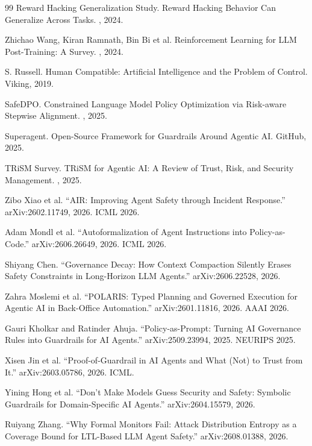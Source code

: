 \begin{thebibliography}{99}
Reward Hacking Generalization Study.
\newblock Reward Hacking Behavior Can Generalize Across Tasks.
, 2024.

Zhichao Wang, Kiran Ramnath, Bin Bi et al.
\newblock Reinforcement Learning for LLM Post-Training: A Survey.
, 2024.

S. Russell.
\newblock Human Compatible: Artificial Intelligence and the Problem of Control.
\newblock Viking, 2019.

SafeDPO.
\newblock Constrained Language Model Policy Optimization via Risk-aware Stepwise Alignment.
, 2025.

Superagent.
\newblock Open-Source Framework for Guardrails Around Agentic AI.
\newblock GitHub, 2025.

TRiSM Survey.
\newblock TRiSM for Agentic AI: A Review of Trust, Risk, and Security Management.
, 2025.


Zibo Xiao et al.
``AIR: Improving Agent Safety through Incident Response.''
arXiv:2602.11749, 2026. ICML 2026.

Adam Mondl et al.
``Autoformalization of Agent Instructions into Policy-as-Code.''
arXiv:2606.26649, 2026. ICML 2026.

Shiyang Chen.
``Governance Decay: How Context Compaction Silently Erases Safety Constraints in Long-Horizon LLM Agents.''
arXiv:2606.22528, 2026.

Zahra Moslemi et al.
``POLARIS: Typed Planning and Governed Execution for Agentic AI in Back-Office Automation.''
arXiv:2601.11816, 2026. AAAI 2026.

Gauri Kholkar and Ratinder Ahuja.
``Policy-as-Prompt: Turning AI Governance Rules into Guardrails for AI Agents.''
arXiv:2509.23994, 2025. NEURIPS 2025.

Xisen Jin et al.
``Proof-of-Guardrail in AI Agents and What (Not) to Trust from It.''
arXiv:2603.05786, 2026. ICML.

Yining Hong et al.
``Don't Make Models Guess Security and Safety: Symbolic Guardrails for Domain-Specific AI Agents.''
arXiv:2604.15579, 2026.

Ruiyang Zhang.
``Why Formal Monitors Fail: Attack Distribution Entropy as a Coverage Bound for LTL-Based LLM Agent Safety.''
arXiv:2608.01388, 2026.
\end{thebibliography}
